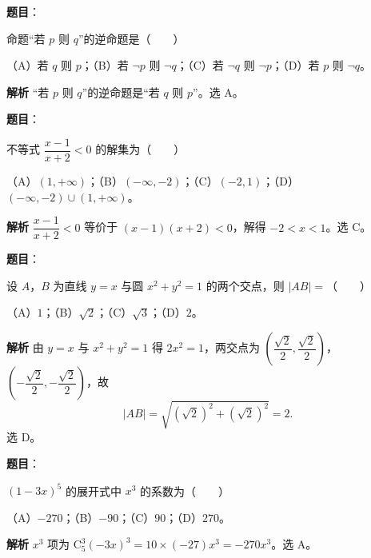 
\begin{answer}

\textbf{题目}：

命题“若 $p$ 则 $q$”的逆命题是\mbox{（　　）}

（A）若 $q$ 则 $p$；（B）若 $\neg p$ 则 $\neg q$；（C）若 $\neg q$ 则 $\neg p$；（D）若 $p$ 则 $\neg q$。

\textbf{解析}
“若 $p$ 则 $q$”的逆命题是“若 $q$ 则 $p$”。选 A。


\end{answer}
\begin{answer}

\textbf{题目}：

不等式 $\dfrac{x-1}{x+2}<0$ 的解集为\mbox{（　　）}

（A）$(1,+\infty)$；（B）$(-\infty,-2)$；（C）$(-2,1)$；（D）$(-\infty,-2)\cup(1,+\infty)$。

\textbf{解析}
$\dfrac{x-1}{x+2}<0$ 等价于 $(x-1)(x+2)<0$，解得 $-2<x<1$。选 C。


\end{answer}
\begin{answer}

\textbf{题目}：

设 $A$，$B$ 为直线 $y=x$ 与圆 $x^2+y^2=1$ 的两个交点，则 $|AB|=$\mbox{（　　）}

（A）$1$；（B）$\sqrt2$；（C）$\sqrt3$；（D）$2$。

\textbf{解析}
由 $y=x$ 与 $x^2+y^2=1$ 得 $2x^2=1$，两交点为 $\left(\dfrac{\sqrt2}2,\dfrac{\sqrt2}2\right)$，$\left(-\dfrac{\sqrt2}2,-\dfrac{\sqrt2}2\right)$，故
\nopagebreak[4]
\[|AB|=\sqrt{(\sqrt2)^2+(\sqrt2)^2}=2.\]
选 D。


\end{answer}
\begin{answer}

\textbf{题目}：

$(1-3x)^5$ 的展开式中 $x^3$ 的系数为\mbox{（　　）}

（A）$-270$；（B）$-90$；（C）$90$；（D）$270$。

\textbf{解析}
$x^3$ 项为 $\mathrm C_5^3(-3x)^3=10\times(-27)x^3=-270x^3$。选 A。


\end{answer}
